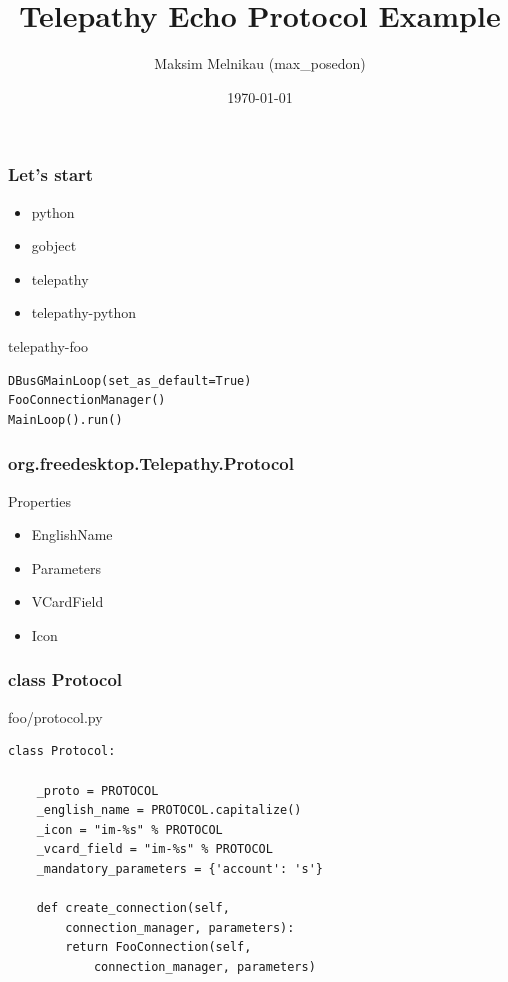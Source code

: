 \documentclass{beamer}
\begin{document}
\title{Telepathy Echo Protocol Example}
\author{Maksim Melnikau (max\_posedon)}
\date{\today}
\frame{\titlepage}

\begin{frame}[fragile]
    \frametitle{Let's start}
    \begin{block}{}
    \begin{itemize}
    \item python
    \item gobject
    \item telepathy
    \item telepathy-python
    \end{itemize}
    \end{block}

    \begin{block}{telepathy-foo}
    \begin{verbatim}
DBusGMainLoop(set_as_default=True)
FooConnectionManager()
MainLoop().run()
    \end{verbatim}
    \end{block}
\end{frame}

\begin{frame}[fragile]
    \frametitle{org.freedesktop.Telepathy.Protocol}

    \begin{block}{Properties}
    \begin{itemize}
    \item EnglishName
    \item Parameters
    \item VCardField
    \item Icon
    \end{itemize}
    \end{block}
\end{frame}

\begin{frame}[fragile]
    \frametitle{class Protocol}
    \begin{block}{foo/protocol.py}
    \begin{verbatim}
class Protocol:

    _proto = PROTOCOL
    _english_name = PROTOCOL.capitalize()
    _icon = "im-%s" % PROTOCOL
    _vcard_field = "im-%s" % PROTOCOL
    _mandatory_parameters = {'account': 's'}
    
    def create_connection(self,
        connection_manager, parameters):
        return FooConnection(self, 
            connection_manager, parameters)
    \end{verbatim}
    \end{block}
\end{frame}
\end{document}
